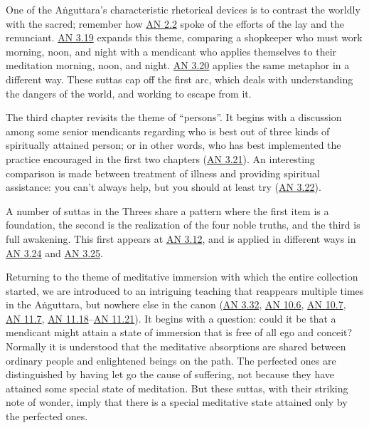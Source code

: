 \documentclass[12pt,openany]{book}%
\begin{document}
One of the \textsanskrit{Aṅguttara}’s characteristic rhetorical devices is to contrast the worldly with the sacred; remember how \href{https://suttacentral.net/an2.1{-}10}{AN 2.2} spoke of the efforts of the lay and the renunciant. \href{https://suttacentral.net/an3.19}{AN 3.19} expands this theme, comparing a shopkeeper who must work morning, noon, and night with a mendicant who applies themselves to their meditation morning, noon, and night. \href{https://suttacentral.net/an3.20}{AN 3.20} applies the same metaphor in a different way. These suttas cap off the first arc, which deals with understanding the dangers of the world, and working to escape from it.

The third chapter revisits the theme of “persons”. It begins with a discussion among some senior mendicants regarding who is best out of three kinds of spiritually attained person; or in other words, who has best implemented the practice encouraged in the first two chapters (\href{https://suttacentral.net/an3.21}{AN 3.21}). An interesting comparison is made between treatment of illness and providing spiritual assistance: you can’t always help, but you should at least try (\href{https://suttacentral.net/an3.22}{AN 3.22}).

A number of suttas in the Threes share a pattern where the first item is a foundation, the second is the realization of the four noble truths, and the third is full awakening. This first appears at \href{https://suttacentral.net/an3.12}{AN 3.12}, and is applied in different ways in \href{https://suttacentral.net/an3.24}{AN 3.24} and \href{https://suttacentral.net/an3.25}{AN 3.25}.

Returning to the theme of meditative immersion with which the entire collection started, we are introduced to an intriguing teaching that reappears multiple times in the \textsanskrit{Aṅguttara}, but nowhere else in the canon (\href{https://suttacentral.net/an3.32}{AN 3.32}, \href{https://suttacentral.net/an10.6}{AN 10.6}, \href{https://suttacentral.net/an10.7}{AN 10.7}, \href{https://suttacentral.net/an11.7}{AN 11.7}, \href{https://suttacentral.net/an11.18}{AN 11.18}–\href{https://suttacentral.net/an11.21}{AN 11.21}). It begins with a question: could it be that a mendicant might attain a state of immersion that is free of all ego and conceit? Normally it is understood that the meditative absorptions are shared between ordinary people and enlightened beings on the path. The perfected ones are distinguished by having let go the cause of suffering, not because they have attained some special state of meditation. But these suttas, with their striking note of wonder, imply that there is a special meditative state attained only by the perfected ones.
\end{document}
